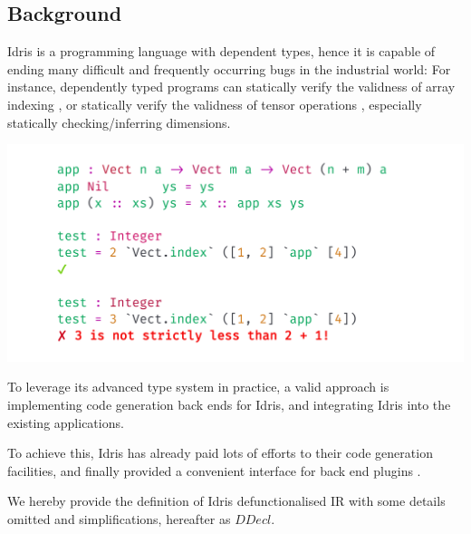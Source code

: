 \documentclass[a1,portrait]{a1poster}
\begin{document}
\begin{multicols}{2}

\section*{Background}

Idris is a programming language with dependent types,
hence it is capable of ending many difficult and frequently occurring bugs in the industrial world:
For instance, dependently typed programs can statically verify the validness of array indexing \cite {xi1998eliminating},
or statically verify the validness of tensor operations \cite {eaton2006statically} \cite {chen2017typesafe},
especially statically checking/inferring dimensions.

\begin{minipage}[b]{1\linewidth}
\begin{center}\vspace{-0.1cm}
\includegraphics[width=0.8\linewidth]{figs/canonical.png}
\end{center}\vspace{-0.1cm}
\end{minipage}

To leverage its advanced type system in practice, a valid approach is
implementing code generation back ends for Idris, and integrating Idris into
the existing applications.

To achieve this, Idris has already paid lots of efforts to their code generation facilities,
and finally provided a convenient interface for back end plugins \cite{brady2015cross}.

We hereby provide the definition of Idris defunctionalised IR with some details omitted and simplifications,
hereafter as $DDecl$.

\vspace{-1cm}


\end{multicols}
\end{document}
